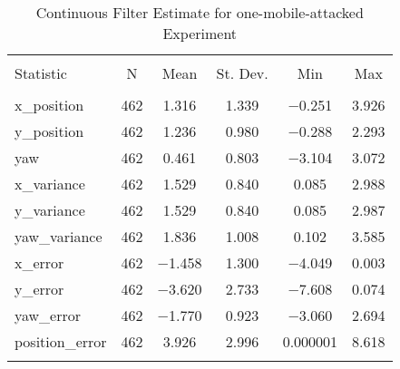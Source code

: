
\begin{table}[h] \centering 
  \caption{Continuous Filter Estimate for one-mobile-attacked Experiment} 
  \label{tab:one_mobile_attacked_continuous_summary} 
\begin{tabular}{@{\extracolsep{5pt}}lccccc} 
\\[-1.8ex]\hline 
\hline \\[-1.8ex] 
Statistic & \multicolumn{1}{c}{N} & \multicolumn{1}{c}{Mean} & \multicolumn{1}{c}{St. Dev.} & \multicolumn{1}{c}{Min} & \multicolumn{1}{c}{Max} \\ 
\hline \\[-1.8ex] 
x\_position & 462 & \num{1.316} & \num{1.339} & $-$0.251 & \num{3.926} \\ 
y\_position & 462 & \num{1.236} & \num{0.980} & $-$0.288 & \num{2.293} \\ 
yaw & 462 & \num{0.461} & \num{0.803} & $-$3.104 & \num{3.072} \\ 
x\_variance & 462 & \num{1.529} & \num{0.840} & \num{0.085} & \num{2.988} \\ 
y\_variance & 462 & \num{1.529} & \num{0.840} & \num{0.085} & \num{2.987} \\ 
yaw\_variance & 462 & \num{1.836} & \num{1.008} & \num{0.102} & \num{3.585} \\ 
x\_error & 462 & $-$1.458 & \num{1.300} & $-$4.049 & \num{0.003} \\ 
y\_error & 462 & $-$3.620 & \num{2.733} & $-$7.608 & \num{0.074} \\ 
yaw\_error & 462 & $-$1.770 & \num{0.923} & $-$3.060 & \num{2.694} \\ 
position\_error & 462 & \num{3.926} & \num{2.996} & \num{0.000001} & \num{8.618} \\ 
\hline \\[-1.8ex] 
\end{tabular} 
\end{table} 
